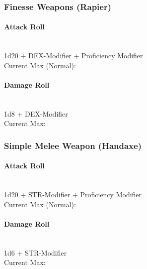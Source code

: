 \documentclass[letterpaper,openany,oneside,twocolumn]{book}
\begin{document}
\subsubsection*{Finesse Weapons (Rapier)}
\paragraph*{Attack Roll}\hfill\\
1d20 + DEX-Modifier + Proficiency Modifier \\
\indent Current Max (Normal): 
\paragraph*{Damage Roll}\hfill\\
1d8 + DEX-Modifier \\
\indent Current Max: 
\subsubsection*{Simple Melee Weapon (Handaxe)}
\paragraph*{Attack Roll}\hfill\\
1d20 + STR-Modifier + Proficiency Modifier \\
\indent Current Max (Normal): 
\paragraph*{Damage Roll}\hfill\\
1d6 + STR-Modifier \\
\indent Current Max: 
\end{document}
